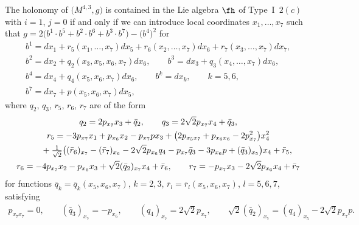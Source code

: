 \begin{Proposition} \label{P2ci} The holonomy of $\big(M^{4,3},g\big)$ is contained in the Lie algebra $\fh$ of Type~I~$2(c)$ with $i=1$, $j=0$ if and only if we can introduce local coordinates $x_1,\dots,x_7$ such that $g=2\big(b^1\cdot b^5+b^2\cdot b^6+b^3\cdot b^7\big)- \big(b^4\big)^2$ for
\begin{gather*}
b^1 = dx_1 + r_5(x_1,\dots, x_7)dx_5+r_6(x_2,\dots,x_7)dx_6+r_7(x_3,\dots,x_7)dx_7, \\
b^2 = dx_2+q_2(x_3,x_5,x_6,x_7)dx_6, \qquad
b^3 = dx_3+q_3(x_4,\dots,x_7) dx_6, \\
b^4 = dx_4+q_4(x_5,x_6,x_7)dx_6, \qquad
b^k = dx_k,\qquad k=5,6, \\
b^7 = dx_7 +p(x_5,x_6,x_7)dx_5,
\end{gather*}
where $q_2$, $q_3$, $r_5$, $r_6$, $r_7$ are of the form
\begin{gather*}
q_2 = 2p_{x_7}x_3+\bar q_2,\qquad
q_3 = 2\sqrt 2 p_{x_7}x_4+\bar q_3,\\
r_5 = -3p_{x_7}x_1+p_{x_6} x_2-p_{x_7}px_3 + \big(2 p_{x_5x_7}+p_{x_6 x_6}-2p_{x_7}^2\big)x_4^2 \\
 \hphantom{r_5 =}{} + \tfrac1{\sqrt2} \big((\bar r_6)_{x_7}-(\bar r_7)_{x_6}-2\sqrt2 p_{x_6}q_4-p_{x_7}\bar q_3 -3p_{x_6}p+(\bar q_3)_{x_5}\big)x_4+\bar r_5,\\
r_6 = -4p_{x_7}x_2- p_{x_6}x_3+\sqrt2 (\bar q_2)_{x_7}x_4+\bar r_6,\qquad
r_7 = -p_{x_7}x_3-2\sqrt2 p_{x_6}x_4+\bar r_7
\end{gather*}
for functions $\bar q_k=\bar q_k(x_5,x_6,x_7)$, $k=2,3$, $\bar r_l=\bar r_l(x_5,x_6,x_7)$, $l=5,6,7$, satisfying
\begin{gather*}p_{x_7 x_7}=0, \qquad (\bar q_3)_{x_7}=-p_{x_6},\qquad (q_4)_{x_7}=2\sqrt2 p_{x_7}, \qquad
\sqrt2 (\bar q_2)_{x_7}=(q_4)_{x_5}-2\sqrt2 p_{x_7}p.
\end{gather*}
\end{Proposition}
